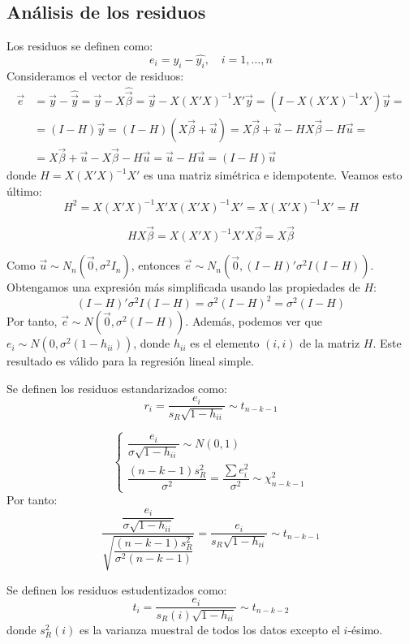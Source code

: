 \subsection*{Análisis de los residuos}
Los residuos se definen como:
$$e_i = y_i - \hat{y_i}, \quad i = 1, \dots, n$$
Consideramos el vector de residuos:
\begin{align*}
    \vec{e} & = \vec{y} - \hat{\vec{y}} = \vec{y} - X\hat{\vec{\beta}} = \vec{y} - X(X'X)^{-1}X'\vec{y} = (I - X(X'X)^{-1}X')\vec{y} = \\
            & = (I-H)\vec{y} = (I-H)(X\vec{\beta}+\vec{u}) = X\vec{\beta} + \vec{u} - HX\vec{\beta} - H\vec{u} =                       \\
            & = X\vec{\beta} + \vec{u} - X\vec{\beta} - H\vec{u} = \vec{u} - H\vec{u} = (I-H)\vec{u}
\end{align*}
donde $H = X(X'X)^{-1}X'$ es una matriz simétrica e idempotente.
Veamos esto último:
$$H^2 = X(X'X)^{-1}X'X(X'X)^{-1}X' = X(X'X)^{-1}X' = H$$

\begin{note}
    $$HX\vec{\beta} = X(X'X)^{-1}X'X\vec{\beta} = X\vec{\beta}$$
\end{note}

Como $\vec{u} \sim N_n(\vec{0}, \sigma^2I_n)$, entonces $\vec{e} \sim N_n(\vec{0}, (I-H)'\sigma^2I(I-H))$.
Obtengamos una expresión más simplificada usando las propiedades de $H$:
$$(I-H)'\sigma^2I(I-H) = \sigma^2(I-H)^2 = \sigma^2(I-H)$$
Por tanto, $\vec{e} \sim N(\vec{0}, \sigma^2(I-H))$.
Además, podemos ver que $e_i \sim N(0, \sigma^2(1-h_{ii}))$, donde $h_{ii}$ es el elemento $(i,i)$ de la matriz $H$.
Este resultado es válido para la regresión lineal simple.

Se definen los residuos estandarizados como:
$$r_i = \frac{e_i}{s_R\sqrt{1-h_{ii}}} \sim t_{n-k-1}$$

\begin{note}
    $$\begin{cases}
            \dfrac{e_i}{\sigma\sqrt{1-h_{ii}}} \sim N(0, 1) \\
            \dfrac{(n-k-1)s_R^2}{\sigma^2} = \dfrac{\sum e_i^2}{\sigma^2} \sim \chi^2_{n-k-1}
        \end{cases}$$
    Por tanto:
    $$\frac{\dfrac{e_i}{\sigma\sqrt{1-h_{ii}}}}{\sqrt{\dfrac{(n-k-1)s_R^2}{\sigma^2(n-k-1)}}} = \frac{e_i}{s_R\sqrt{1-h_{ii}}} \sim t_{n-k-1}$$
\end{note}

Se definen los residuos estudentizados como:
$$t_i = \frac{e_i}{s_R(i)\sqrt{1-h_{ii}}} \sim t_{n-k-2}$$
donde $s_R^2(i)$ es la varianza muestral de todos los datos excepto el $i$-ésimo.

